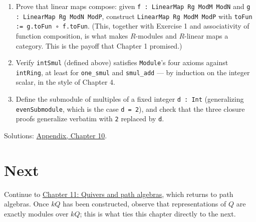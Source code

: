 \begin{enumerate}
  Prove that the identity function is a linear map: for any \texttt{Mod : Module R Rg M}, construct \texttt{idLinearMap : LinearMap Rg Mod Mod} with \texttt{toFun := id}.
\item
  Prove that linear maps compose: given \texttt{f : LinearMap Rg ModM ModN} and \texttt{g : LinearMap Rg ModN ModP}, construct \texttt{LinearMap Rg ModM ModP} with \texttt{toFun := g.toFun ∘ f.toFun}. (This, together with Exercise 1 and associativity of function composition, is what makes \(R\)-modules and \(R\)-linear maps a category. This is the payoff that Chapter 1 promised.)
\item
  Verify \texttt{intSmul} (defined above) satisfies \texttt{Module}'s four axioms against \texttt{intRing}, at least for \texttt{one\_\allowbreak{}smul} and \texttt{smul\_\allowbreak{}add} --- by induction on the integer scalar, in the style of Chapter 4.
\item
  Define the submodule of multiples of a fixed integer \texttt{d : Int} (generalizing \texttt{evenSubmodule}, which is the case \texttt{d = 2}), and check that the three closure proofs generalize verbatim with \texttt{2} replaced by \texttt{d}.
\end{enumerate}

Solutions: \hyperref[sec:14-appendix-solutions:09-chapter-10:1]{Appendix, Chapter 10}.

\section{Next}\label{sec:10-modules:07-exercises:2}

Continue to \hyperref[sec:11-path-algebras:00-index:1]{Chapter 11: Quivers and path algebras}, which returns to path algebras. Once \(kQ\) has been constructed, observe that representations of \(Q\) are exactly modules over \(kQ\); this is what ties this chapter directly to the next.
